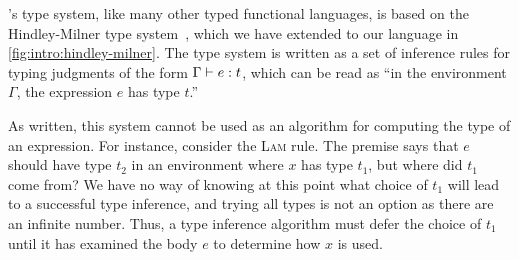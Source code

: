 \ocaml's type system, like many other typed functional languages, is
based on the Hindley-Milner type
system~\citep{Hindley1969-pb,Milner1978-da}, which we have extended to
our language in \autoref{fig:intro:hindley-milner}.
%
The type system is written as a set of inference rules for typing
judgments of the form $\Gamma \vdash e : t$, which can be read as ``in
the environment $\Gamma$, the expression $e$ has type $t$.''

As written, this system cannot be used as an algorithm for computing the
type of an expression.
%
For instance, consider the \textsc{Lam} rule.
%
The premise says that $e$ should have type $t_2$ in an environment where
$x$ has type $t_1$, but where did $t_1$ come from?
%
We have no way of knowing at this point what choice of $t_1$ will lead
to a successful type inference, and trying all types is not an option
as there are an infinite number.
%
Thus, a type inference algorithm must defer the choice of $t_1$ until it
has examined the body $e$ to determine how $x$ is used.

